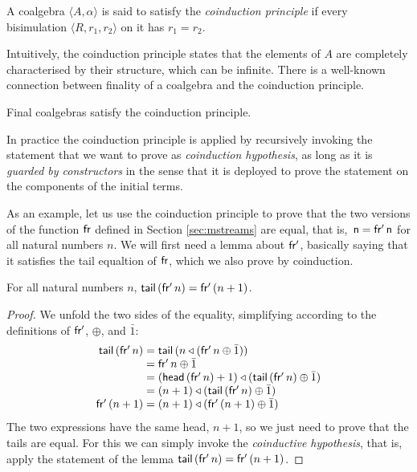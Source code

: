 \begin{definition}\label{def:coinduction}
A coalgebra $\langle A,\alpha\rangle$ is said to satisfy the {\em coinduction principle} if every bisimulation $\langle R,r_1,r_2\rangle$ on it has $r_1=r_2$.
\end{definition}

Intuitively, the coinduction principle states that the elements of $A$ are completely characterised by their structure, which can be infinite.
There is a well-known connection between finality of a coalgebra and the coinduction principle.

\begin{theorem}\label{th:coinduction}
Final coalgebras satisfy the coinduction principle.
\end{theorem}

In practice the coinduction principle is applied by recursively invoking the statement that we want to prove as {\em coinduction hypothesis}, as long as it is {\em guarded by constructors} in the sense that it is deployed to prove the statement on the components of the initial terms.

As an example, let us use the coinduction principle to prove that the two versions of the function $\mathsf{fr}$ defined in Section \ref{sec:mstreams} are equal,
that is, $\sf\,n = \mathsf{fr'}\,n$ for all natural numbers $n$.
We will first need a lemma about $\mathsf{fr'}$, basically saying that it satisfies the tail equaltion of $\mathsf{fr}$, which we also prove by coinduction.
\begin{lemma}\label{lemma:sfp}
For all natural numbers $n$, $\mathsf{tail}\,(\mathsf{fr'}\,n) = \mathsf{fr'}\,(n+1)$.
\end{lemma}
\begin{proof}
We unfold the two sides of the equality, simplifying according to the definitions of $\mathsf{fr'}$, $\oplus$, and $\bar{1}$:
$$
\begin{array}{r@{{}={}}l}
\tail\,(\sfp\,n)
& \tail\,(n \scons (\sfp\,n \oplus \bar{1}))\\
& \sfp\,n \oplus \bar{1}\\
& (\head\,(\sfp\,n) +1) \scons (\tail\,(\sfp\,n)  \oplus \bar{1})\\
& (n+1) \scons (\tail\,(\sfp\,n)  \oplus \bar{1})\\
\sfp\,(n+1)
& (n+1) \scons (\sfp\,(n+1) \oplus \bar{1})
\end{array}
$$
The two expressions have the same head, $n+1$, so we just need to prove that the tails are equal.
For this we can simply invoke the {\em coinductive hypothesis}, that is, apply the statement of the lemma $\mathsf{tail}\,(\mathsf{fr'}\,n) = \mathsf{fr'}\,(n+1)$.
\end{proof}


